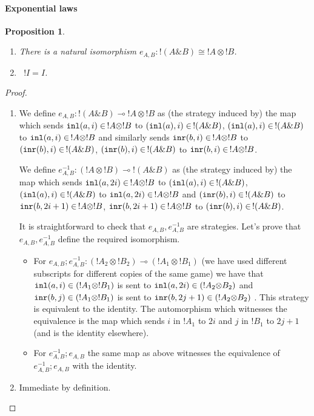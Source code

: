 \documentclass[11pt]{article}
\newtheorem{proposition}[theorem]{Proposition}
\newcommand{\ofcourse}{\mbox{$!$}}
\newcommand{\with}{\mbox{$\&$}}
\newcommand{\tensor}{\mbox{$\otimes$}}
\newcommand{\linimpl}{\mbox{$\multimap$}}
\begin{document}
\paragraph{Exponential laws}
\begin{proposition}
\begin{enumerate}
\item There is a natural isomorphism
$e_{A,B} : \ofcourse (A \with B) \cong \ofcourse A \tensor \ofcourse B$.
\item \, $\ofcourse I = I$.
\end{enumerate}
\end{proposition}
\begin{proof}
\begin{enumerate}
\item We define $e_{A,B}:!(A \with B ) \linimpl !A \tensor !B $ as
  (the strategy induced by) the
map which sends ${\tt inl} (a,i)\in \, !A \tensor !B $ to
$({\tt inl}(a),i)\in\, !(A \with B ) $, $({\tt inl}(a),i)\in \, !(A \with B ) $ to
${\tt inl} (a,i)\in \, !A \tensor !B $ and similarly sends ${\tt inr}
(b,i)\in \, !A
\tensor !B$ to $({\tt inr}(b),i)\in \, !(A \with B ) $, $({\tt
  inr}(b),i)\in \,
!(A
\with B ) $ to  ${\tt inr} (b,i)\in \, !A \tensor !B $.

We define ${e_{A,B}^{-1}}:(!A \tensor !B) \linimpl !(A \with B )$ as
(the strategy induced by) the map
which sends ${\tt inl}(a,2i)\in \, !A \tensor !B $ to $({\tt
  inl}(a),i)\in \, !(A\with
B)$,  $({\tt inl}(a),i)\in \, !(A\with B)$ to ${\tt inl}(a,2i)\in \, !A \tensor !B
$ and $({\tt inr}(b),i)\in \, !(A \with B ) $ to  ${\tt inr} (b,2i+1)\in
\, !A \tensor
!B $, ${\tt inr} (b,2i +1)\in \, !A \tensor !B$ to $({\tt inr}(b),i)\in
\, !(A \with B
) $.

It is straightforward to check that $e_{A,B},{e_{A,B}^{-1}}$ are strategies.
Let's prove that $e_{A,B},{e_{A,B}^{-1}}$ define the required isomorphism.

\begin{itemize}
\item For $ e_{A,B}; {e_{A,B}^{-1}} :  (!A_2 \tensor !B_2) \linimpl (!A_1 \tensor
!B_1)$ (we have used different subscripts for different copies of
the same game) we have that ${\tt inl}(a,i)\in (!A_1\tensor !B_1)$ is sent to
${\tt inl}(a,2i)\in (!A_2\tensor B_2)$ and ${\tt inr}(b,j)\in (!A_1\tensor !B_1)$ is
sent to ${\tt inr}(b,2j+1)\in (!A_2\tensor B_2)$ . This strategy is
equivalent to the
identity. The automorphism which witnesses the equivalence is the map
which sends $i$ in $!A_1$ to $2i$ and $j$ in $!B_1$ to $2j+1$ (and is
the identity elsewhere).

\item For ${e_{A,B}^{-1}}; e_{A,B}$ the same map as above witnesses the
equivalence of ${e_{A,B}^{-1}}; e_{A,B}$ with the identity.
\end{itemize}
\item Immediate by definition.

\end{enumerate}
\end{proof}
\end{document}
